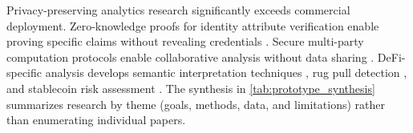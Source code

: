 Privacy-preserving analytics research significantly exceeds commercial deployment. Zero-knowledge proofs for identity attribute verification enable proving specific claims without revealing credentials \cite{yang2024researchidentitydata,zhang2024blockchainzeroknowledge,ben-sasson2017scalablezeroknowledge}. Secure multi-party computation protocols enable collaborative analysis without data sharing \cite{bansod2022challengesmakingblockchain}. DeFi-specific analysis develops semantic interpretation techniques \cite{chen2020understandingethereumgraph,sun2025ethereumfrauddetection}, rug pull detection \cite{sun2024sokcomprehensiveanalysis}, and stablecoin risk assessment \cite{ling2025sokstablecoindesigns,financialactiontaskforcefatf2020reportg20socalled}. The synthesis in \autoref{tab:prototype_synthesis} summarizes research by theme (goals, methods, data, and limitations) rather than enumerating individual papers.


